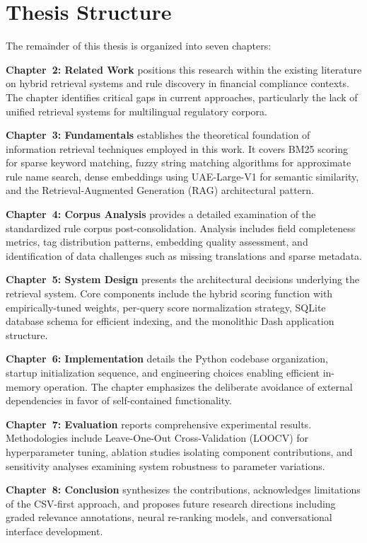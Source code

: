 \section{Thesis Structure}

The remainder of this thesis is organized into seven chapters:

\textbf{Chapter~2: Related Work} positions this research within the existing literature on hybrid retrieval systems and rule discovery in financial compliance contexts. The chapter identifies critical gaps in current approaches, particularly the lack of unified retrieval systems for multilingual regulatory corpora.

\textbf{Chapter~3: Fundamentals} establishes the theoretical foundation of information retrieval techniques employed in this work. It covers BM25 scoring for sparse keyword matching, fuzzy string matching algorithms for approximate rule name search, dense embeddings using UAE-Large-V1 for semantic similarity, and the Retrieval-Augmented Generation (RAG) architectural pattern.

\textbf{Chapter~4: Corpus Analysis} provides a detailed examination of the standardized rule corpus post-consolidation. Analysis includes field completeness metrics, tag distribution patterns, embedding quality assessment, and identification of data challenges such as missing translations and sparse metadata.

\textbf{Chapter~5: System Design} presents the architectural decisions underlying the retrieval system. Core components include the hybrid scoring function with empirically-tuned weights, per-query score normalization strategy, SQLite database schema for efficient indexing, and the monolithic Dash application structure.

\textbf{Chapter~6: Implementation} details the Python codebase organization, startup initialization sequence, and engineering choices enabling efficient in-memory operation. The chapter emphasizes the deliberate avoidance of external dependencies in favor of self-contained functionality.

\textbf{Chapter~7: Evaluation} reports comprehensive experimental results. Methodologies include Leave-One-Out Cross-Validation (LOOCV) for hyperparameter tuning, ablation studies isolating component contributions, and sensitivity analyses examining system robustness to parameter variations.

\textbf{Chapter~8: Conclusion} synthesizes the contributions, acknowledges limitations of the CSV-first approach, and proposes future research directions including graded relevance annotations, neural re-ranking models, and conversational interface development.
